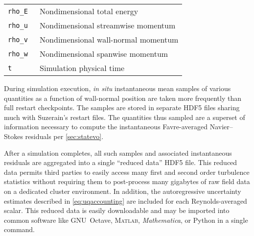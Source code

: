 \begin{table}
\begin{small}
\begin{tabular}{p{}|p{}}
\texttt{rho\_E                } & Nondimensional total energy \\
\texttt{rho\_u                } & Nondimensional streamwise momentum \\
\texttt{rho\_v                } & Nondimensional wall-normal momentum \\
\texttt{rho\_w                } & Nondimensional spanwise momentum \\
\texttt{t                     } & Simulation physical time \\
\end{tabular}
\end{small}
\end{table}

During simulation execution, \emph{in situ} instantaneous mean samples
of various quantities as a function of wall-normal position are taken
more frequently than full restart checkpoints.  The samples are stored
in separate HDF5 files sharing much with Suzerain's restart files.
The quantities thus sampled are a superset of information necessary to
compute the instantaneous Favre-averaged Navier--Stokes residuals per
\autoref{sec:statevo}.

After a simulation completes, all such samples and associated instantaneous
residuals are aggregated into a single ``reduced data'' HDF5 file.  This reduced
data permits third parties to easily access many first and second order
turbulence statistics without requiring them to post-process many gigabytes of
raw field data on a dedicated cluster environment.  In addition, the
autoregressive uncertainty estimates described in \autoref{eq:uqaccounting} are
included for each Reynolds-averaged scalar.  This reduced data is easily
downloadable and may be imported into common software like GNU~Octave,
\textsc{Matlab}\textsuperscript{\textregistered}, \textit{Mathematica}\textsuperscript{\textregistered}, or
Python in a single command.
